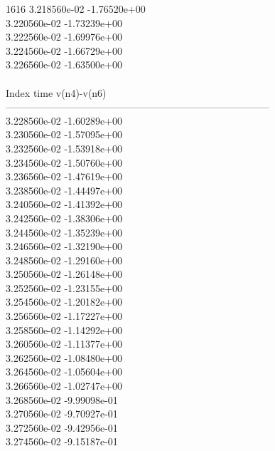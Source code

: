 1616	3.218560e-02	-1.76520e+00	\\ 	3.220560e-02	-1.73239e+00	\\ 	3.222560e-02	-1.69976e+00	\\ 	3.224560e-02	-1.66729e+00	\\ 	3.226560e-02	-1.63500e+00	\\ \hline
\\ \hline
Index   time            v(n4)-v(n6)     \\ \hline
--------------------------------------------------------------------------------\\ 	3.228560e-02	-1.60289e+00	\\ 	3.230560e-02	-1.57095e+00	\\ 	3.232560e-02	-1.53918e+00	\\ 	3.234560e-02	-1.50760e+00	\\ 	3.236560e-02	-1.47619e+00	\\ 	3.238560e-02	-1.44497e+00	\\ 	3.240560e-02	-1.41392e+00	\\ 	3.242560e-02	-1.38306e+00	\\ 	3.244560e-02	-1.35239e+00	\\ 	3.246560e-02	-1.32190e+00	\\ 	3.248560e-02	-1.29160e+00	\\ 	3.250560e-02	-1.26148e+00	\\ 	3.252560e-02	-1.23155e+00	\\ 	3.254560e-02	-1.20182e+00	\\ 	3.256560e-02	-1.17227e+00	\\ 	3.258560e-02	-1.14292e+00	\\ 	3.260560e-02	-1.11377e+00	\\ 	3.262560e-02	-1.08480e+00	\\ 	3.264560e-02	-1.05604e+00	\\ 	3.266560e-02	-1.02747e+00	\\ 	3.268560e-02	-9.99098e-01	\\ 	3.270560e-02	-9.70927e-01	\\ 	3.272560e-02	-9.42956e-01	\\ 	3.274560e-02	-9.15187e-01	\\ \hline
